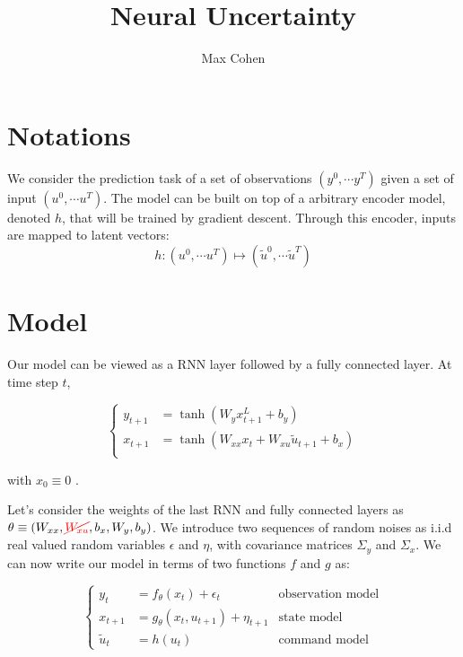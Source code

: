 \documentclass[10pt,a4paper]{article}
\begin{document}
\title{Neural Uncertainty}
\author{Max Cohen}

\section{Notations}
We consider the prediction task of a set of observations $(y^0, \cdots y^T)$ given a set of input $(u^0, \cdots u^T)$.
The model can be built on top of a arbitrary encoder model, denoted $h$, that will be trained by gradient descent.
Through this encoder, inputs are mapped to latent vectors:
$$
        h: (u^0, \cdots u^T) \mapsto (\tilde u^0, \cdots \tilde u^T)
$$

\section{Model}
Our model can be viewed as a RNN layer followed by a fully connected layer. At time step $t$,

\begin{equation*}
        \left\{
        \begin{aligned}
                y_{t+1} & = \tanh(W_y x_{t+1}^L + b_y)                        \\
                x_{t+1} & = \tanh(W_{xx} x_{t} + W_{xu} \tilde u_{t+1} + b_x) \\
        \end{aligned}
        \right.
\end{equation*}

with $x_{0} \equiv 0$ .

Let's consider the weights of the last RNN and fully connected layers as $\theta \equiv (W_{xx}, \textcolor{red}{\cancel{W_{xu}}}, b_x, W_y, b_y)$.
We introduce two sequences of random noises as i.i.d real valued random variables $\epsilon$ and $\eta$, with covariance matrices $\Sigma_y$ and $\Sigma_x$.
We can now write our model in terms of two functions $f$ and $g$ as:

\begin{equation}
        \left\{
        \begin{aligned}
                y_t        & = f_\theta(x_t) + \epsilon_t            & \text{observation model} \\
                x_{t+1}    & = g_\theta(x_{t}, u_{t+1}) + \eta_{t+1} & \text{state model}       \\
                \tilde u_t & = h(u_t)                                & \text{command model}
        \end{aligned}
        \right.
        \label{model_definition}
\end{equation}
\end{document}
